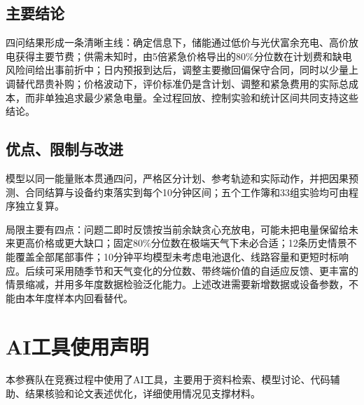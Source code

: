 \documentclass[UTF8,fontset=none,12pt,a4paper]{ctexart}
\begin{document}
\subsection{主要结论}
四问结果形成一条清晰主线：确定信息下，储能通过低价与光伏富余充电、高价放电获得主要节费；供需未知时，由5倍紧急价格导出的80\%分位数在计划费和缺电风险间给出事前折中；日内预报到达后，调整主要撤回偏保守合同，同时以少量上调替代昂贵补购；价格波动下，评价标准仍是含计划、调整和紧急费用的实际总成本，而非单独追求最少紧急电量。全过程回放、控制实验和统计区间共同支持这些结论。

\subsection{优点、限制与改进}
模型以同一能量账本贯通四问，严格区分计划、参考轨迹和实际动作，并把因果预测、合同结算与设备约束落实到每个10分钟区间；五个工作簿和33组实验均可由程序独立复算。

局限主要有四点：问题二即时反馈按当前余缺贪心充放电，可能未把电量保留给未来更高价格或更大缺口；固定80\%分位数在极端天气下未必合适；12条历史情景不能覆盖全部尾部事件；10分钟平均模型未考虑电池退化、线路容量和更短时标响应。后续可采用随季节和天气变化的分位数、带终端价值的自适应反馈、更丰富的情景缩减，并用多年度数据检验泛化能力。上述改进需要新增数据或设备参数，不能由本年度样本内回看替代。

\section*{AI工具使用声明}
本参赛队在竞赛过程中使用了AI工具，主要用于资料检索、模型讨论、代码辅助、结果核验和论文表述优化，详细使用情况见支撑材料。

\begingroup\small{}\raggedright{}


\endgroup
\label{LastMainPage}
\clearpage
\appendix
{}
\end{document}
